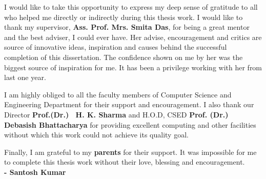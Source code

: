 \documentclass[english,a4paper,babel,12pt]{nitathesis}
\begin{document}






\beforepreface


I would like to take this opportunity to express my deep sense of gratitude to all who helped me directly or indirectly during this thesis work.
 I would like to thank my supervisor, \textbf{Ass. Prof. Mrs. Smita Das}, for being a great mentor and the best adviser, I could ever have. Her advise, encouragement and critics are source of innovative ideas, inspiration and causes behind the successful completion of this dissertation. The confidence shown on me  by her was the biggest source of inspiration 
for me. It has been a privilege working with her from last one year.\

I am highly obliged to all the faculty members of Computer Science and Engineering Department for their support and encouragement. 
I also thank our Director \textbf{Prof.(Dr.)~ H. K. Sharma} and H.O.D, CSED \textbf {Prof. (Dr.)~ Debasish Bhattacharya }
for providing excellent computing and other facilities without which this work could not achieve its quality goal.
\
 

 Finally, I am grateful to my \textbf{parents} for their support. It was impossible for me to complete 
this thesis work without their love, blessing  and
encouragement.
\\

\vspace*{0.5cm} \hspace*{11cm}\textbf{\large - Santosh Kumar}
\setcounter{page}{6}
 
\end{document}
